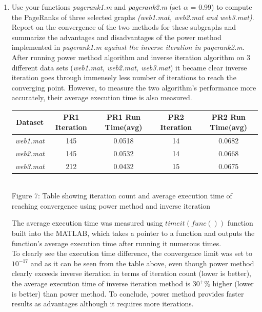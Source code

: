 \documentclass[unicode,11pt,a4paper,oneside,numbers=endperiod,openany]{scrartcl}
\begin{document}
\begin{enumerate}
{From limited data observed through inverse iteration algorithm ($\alpha = 0.92, 0.915$ are added for better analysis), we can observe that the $\alpha$ is inversely proportional to iteration count, because as $\alpha$ decreases, iteration count till convergence increases as it is moving away from $\lambda$. Also the iteration count exponentially increases as $\alpha$ gets smaller. Furthermore, after certain value of $\alpha$ (between 0.9 to 0.915), it becomes incomputable.}

\item {Use your functions \textit{pagerank1.m} and \textit{pagerank2.m} (set $\alpha$ = 0.99) to compute the PageRanks of three
selected graphs \textit{(web1.mat, web2.mat and web3.mat)}. Report on the convergence of the two methods
for these subgraphs and summarize the advantages and disadvantages of the power method implemented in
\textit{pagerank1.m against the inverse iteration in pagerank2.m}.} \\

After running power method algorithm and inverse iteration algorithm on 3 different data sets (\textit{web1.mat, web2.mat, web3.mat}) it became clear inverse iteration goes through immensely less number of iterations to reach the converging point. However, to measure the two algorithm's performance more accurately, their average execution time is also measured.

\begin{center}
 \begin{tabular}{| c | c | c | c | c |}
 \hline
 Dataset & PR1 Iteration & PR1 Run Time(avg) & PR2 Iteration & PR2 Run Time(avg) \\
 \hline
 \textit{web1.mat} & 145 & 0.0518 & 14 & 0.0682 \\
 \hline
 \textit{web2.mat} & 145 & 0.0532 & 14 & 0.0668 \\
 \hline
 \textit{web3.mat} & 212 & 0.0432 & 15 & 0.0675 \\
 \hline
 \end{tabular}\\
 \vspace{5px}
{Figure 7: Table showing iteration count and average execution time of reaching convergence using power method and inverse iteration}
\end{center}

{The average execution time was measured using $timeit(func())$ function built into the MATLAB, which takes a pointer to a function and outputs the function's average execution time after running it numerous times.}\\

{To clearly see the execution time difference, the convergence limit was set to $10^{-17}$ and as it can be seen from the table above, even though power method clearly exceeds inverse iteration in terms of iteration count (lower is better), the average execution time of inverse iteration method is $30^{+}\%$ higher (lower is better) than power method. To conclude, power method provides faster results as advantages although it requires more iterations.}
\end{enumerate}
\end{document}
